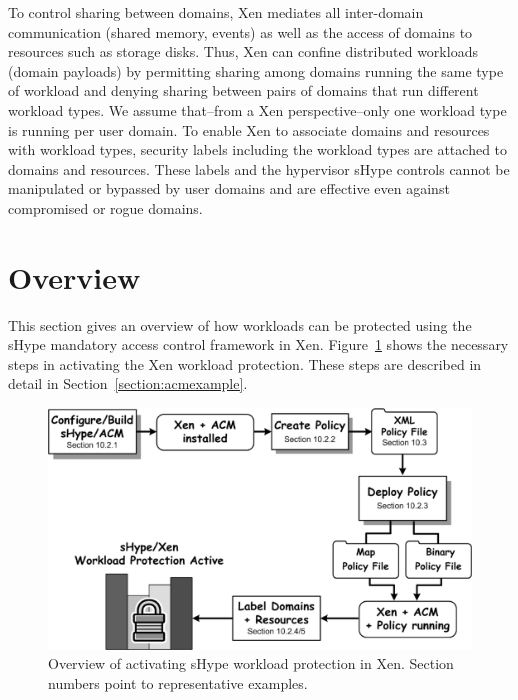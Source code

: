 \documentclass[11pt,twoside,final,openright]{report}
\begin{document}
To control sharing between domains, Xen mediates all inter-domain
communication (shared memory, events) as well as the access of domains
to resources such as storage disks. Thus, Xen can confine distributed
workloads (domain payloads) by permitting sharing among domains
running the same type of workload and denying sharing between pairs of
domains that run different workload types. We assume that--from a Xen
perspective--only one workload type is running per user domain. To
enable Xen to associate domains and resources with workload types,
security labels including the workload types are attached to domains
and resources. These labels and the hypervisor sHype controls cannot
be manipulated or bypassed by user domains and are effective even
against compromised or rogue domains.

\section{Overview}
This section gives an overview of how workloads can be protected using
the sHype mandatory access control framework in Xen.
Figure~\ref{fig:acmoverview} shows the necessary steps in activating
the Xen workload protection. These steps are described in detail in
Section~\ref{section:acmexample}.

\begin{figure}
\centering
\includegraphics[width=13cm]{figs/acm_overview.eps}
\caption{Overview of activating sHype workload protection in Xen.
  Section numbers point to representative examples.}
\label{fig:acmoverview}
\end{figure}
\end{document}
